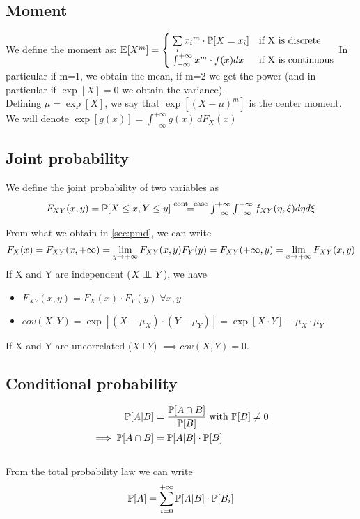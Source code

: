 \subsection{Moment}
We define  the moment as:
$\mathbb{E}[X^m]=
\begin{cases}
    \sum\limits_{i} {x{_i}^{m} \cdot \mathbb{P}[X=x_i]} & \text{if X is discrete } \\
    \int_{-\infty}^{+\infty} {x^{m} \cdot f(x) dx }  & \text{if X is continuous}
\end{cases}$
In particular if m=1, we obtain the mean, if m=2 we get the power (and in particular if $\exp[X]=0$ we obtain the variance).\\
Defining $\mu = \exp[X]$, we say that $\exp[(X-\mu)^m]$ is the center moment.\\
We will denote $\exp[g(x)]=\int_{-\infty}^{+\infty} g(x)\, d F_X(x)$

\subsection{Joint probability}
We define the joint probability of two variables as
\begin{equation*}
  $$F_{XY}(x,y)=\prob[X\le x , Y \le y] \stackrel{\text{cont. case}}{=} \int_{-\infty}^{+\infty}\int_{-\infty}^{+\infty} f_{XY}(\eta,\xi) d\eta d\xi$$
\end{equation*}

From what we obtain in \ref{sec:pmd}, we can write \\
\begin{equation*}
  $$F_X(x)=F_{XY}(x,+\infty)=\lim\limits_{y \to +\infty} F_{XY}(x,y)$$
  $$F_Y(y)=F_{XY}(+\infty,y)=\lim\limits_{x \to +\infty} F_{XY}(x,y)$$
\end{equation*}
If X and Y are independent ($X \mathrel{\perp\mspace{-10mu}\perp} Y$), we have
\begin{itemize}
  \item $F_{XY}(x,y)=F_X(x)\cdot F_Y(y) \; \forall x,y$
  \item $cov(X,Y) = \exp[(X - \mu_X)\cdot (Y - \mu_Y)] = \exp[X \cdot Y]-\mu_X \cdot \mu_Y$
\end{itemize}
If X and Y are uncorrelated ($X \bot Y$) $\implies cov(X,Y)=0$.

\subsection{Conditional probability}
\begin{equation}
  \begin{split}
    \mathbb{P}[A | B]&= \frac{\mathbb{P}[A \cap B]}{\mathbb{P}[B]} \; \text{with $\mathbb{P}[B]\ne 0$} \\
    \implies \mathbb{P}[A \cap B ] &= \mathbb{P}[A | B ]\cdot \mathbb{P}[B]
  \end{split}
\end{equation}\\
From the total probability law we can write\\
$$\mathbb{P}[A]= \sum\limits_{i=0}^{+\infty}\mathbb{P}[A|B]\cdot \mathbb{P}[B_i]$$

